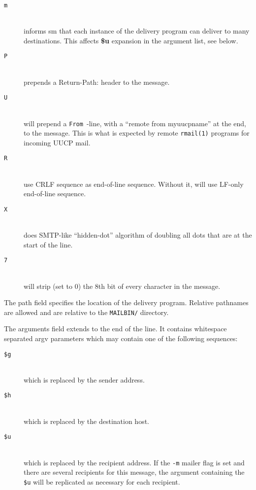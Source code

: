 \begin{description}
\item[ {\tt m}] \mbox{} \\
informs sm that each instance of the delivery program  
can deliver to many destinations. This affects {\bf \$u} expansion 
in the argument list, see below.

\item[ {\tt P}] \mbox{} \\
prepends a Return-Path: header to the message.

\item[ {\tt U}] \mbox{} \\
will prepend a \verb*/From /-line, with a ``remote from
myuucpname'' at the end, to the message. This is what is expected by remote 
{\tt rmail(1)} programs for incoming UUCP mail.

\item[ {\tt R}] \mbox{} \\
use CRLF sequence as end-of-line sequence. Without
it, will use LF-only end-of-line sequence.

\item[ {\tt X}] \mbox{} \\
does SMTP-like ``hidden-dot'' algorithm  of doubling
all dots that are at the start of the line.

\item[ {\tt 7}] \mbox{} \\
will strip (set to 0) the 8th bit of every character in the 
message.

\end{description}


The path field specifies the location of the delivery program. Relative 
pathnames are allowed and are relative to the {\tt MAILBIN/} directory.

The arguments field extends to the end of the line. It
contains  whitespace separated  argv  parameters which may
contain one of the following sequences:

\begin{description}
\item[ {\tt \$g}] \mbox{} \\
which is replaced by the sender address.

\item[ {\tt \$h}] \mbox{} \\
which is replaced by the destination host.

\item[ {\tt \$u}] \mbox{} \\
which is replaced by the recipient address.  If the
{\tt -m} mailer flag is set and there are several recipients for this 
message, the argument containing  the {\tt \$u} will be replicated 
as necessary for each recipient.

\end{description}

